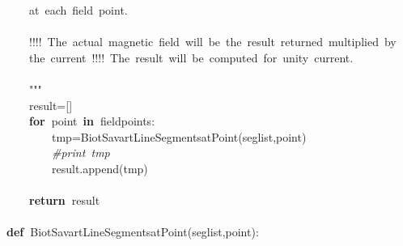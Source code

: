 \documentclass{article}
\newcommand{\hlstd}[1]{\textcolor[rgb]{0,0,0}{#1}}
\newcommand{\hlstr}[1]{\textcolor[rgb]{1,0,0}{#1}}
\newcommand{\hlslc}[1]{\textcolor[rgb]{0.51,0.51,0.51}{\it{#1}}}
\newcommand{\hlsym}[1]{\textcolor[rgb]{0,0,0}{#1}}
\newcommand{\hlkwa}[1]{\textcolor[rgb]{0,0,0}{\bf{#1}}}
\newcommand{\hlkwd}[1]{\textcolor[rgb]{0,0,0.51}{#1}}
\begin{document}
\hlstr{}\hlstd{\ \ \ \ }\hlstr{at\ each\ field\ point.}\hspace*{\fill}\\
\hlstr{}\hspace*{\fill}\\
\hlstr{}\hlstd{\ \ \ \ }\hlstr{!!!!\ The\ actual\ magnetic\ field\ will\ be\ the\ result\ returned\ multiplied\ by}\hspace*{\fill}\\
\hlstr{}\hlstd{\ \ \ \ }\hlstr{the\ current\ !!!!\ The\ result\ will\ be\ computed\ for\ unity\ current.}\hspace*{\fill}\\
\hlstr{}\hspace*{\fill}\\
\hlstr{}\hlstd{\ \ \ \ }\hlstr{"""}\hlstd{\hspace*{\fill}\\
}\hlstd{\ \ \ \ }\hlstd{result}\hlsym{={[}{]}}\hspace*{\fill}\\
\hlstd{}\hlstd{\ \ \ \ }\hlstd{}\hlkwa{for\ }\hlstd{point\ }\hlkwa{in\ }\hlstd{fieldpoints}\hlsym{:}\hspace*{\fill}\\
\hlstd{}\hlstd{\ \ \ \ \ \ \ \ }\hlstd{tmp}\hlsym{=}\hlstd{}\hlkwd{\textunderscore Biot\textunderscore Savart\textunderscore LineSegments\textunderscore at\textunderscore Point}\hlstd{}\hlsym{(}\hlstd{seglist}\hlsym{,}\hlstd{point}\hlsym{)}\hspace*{\fill}\\
\hlstd{}\hlstd{\ \ \ \ \ \ \ \ }\hlstd{}\hlslc{\#print\ tmp}\hspace*{\fill}\\
\hlstd{}\hlstd{\ \ \ \ \ \ \ \ }\hlstd{result}\hlsym{.}\hlstd{}\hlkwd{append}\hlstd{}\hlsym{(}\hlstd{tmp}\hlsym{)}\hspace*{\fill}\\
\hlstd{\hspace*{\fill}\\
}\hlstd{\ \ \ \ }\hlstd{}\hlkwa{return\ }\hlstd{result}\hspace*{\fill}\\
\hspace*{\fill}\\
\hlkwa{def\ }\hlstd{}\hlkwd{\textunderscore Biot\textunderscore Savart\textunderscore LineSegments\textunderscore at\textunderscore Point}\hlstd{}\hlsym{(}\hlstd{seglist}\hlsym{,}\hlstd{point}\hlsym{):}\hspace*{\fill}\\
\end{document}
